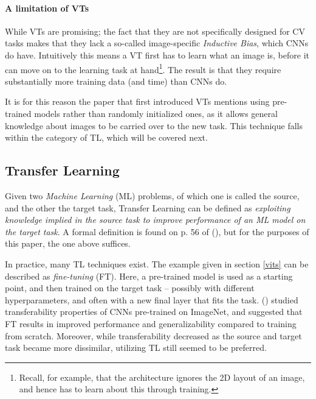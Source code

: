 \paragraph{A limitation of VTs}
While VTs are promising; the fact that they are not specifically designed for CV tasks makes that they lack a so-called image-specific \textit{Inductive Bias}, which CNNs do have. Intuitively this means a VT first has to learn what an image is, before it can move on to the learning task at hand\footnote{Recall, for example, that the architecture ignores the 2D layout of an image, and hence has to learn about this through training.}. The result is that they require substantially more training data (and time) than CNNs do. 

It is for this reason the paper that first introduced VTs \citep{dosovitskiy2020image} mentions using pre-trained models rather than randomly initialized ones, as it allows general knowledge about images to be carried over to the new task. This technique falls within the category of TL, which will be covered next.


\subsection{Transfer Learning}
Given two \textit{Machine Learning} (ML) problems, of which one is called the source, and the other the target task, Transfer Learning can be defined as \textit{exploiting knowledge implied in the source task to improve performance of an ML model on the target task}. A formal definition is found on p. 56 of \citeauthor{sabatelli2022contributions} (\citeyear{sabatelli2022contributions}), but for the purposes of this paper, the one above suffices.

In practice, many TL techniques exist. The example given in section \ref{vits} can be described as \textit{fine-tuning} (FT). Here, a pre-trained model is used as a starting point, and then trained on the target task -- possibly with different hyperparameters, and often with a new final layer that fits the task. \citeauthor{yosinski2014transferable} (\citeyear{yosinski2014transferable}) studied transferability properties of CNNs pre-trained on ImageNet, and suggested that FT results in improved performance and generalizability compared to training from scratch. Moreover, while transferability decreased as the source and target task became more dissimilar, utilizing TL still seemed to be preferred.

